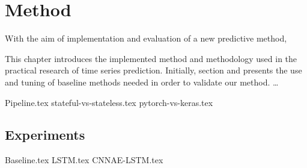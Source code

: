 \chapter{Method}
\label{section:Method}

With the aim of implementation and evaluation of a new predictive method,

This chapter introduces the implemented method and methodology used in the practical research of time series prediction.
Initially, section  and  presents the use and tuning of baseline methods needed in order to validate our method.
\dots

{Pipeline.tex}
{stateful-vs-stateless.tex}
{pytorch-vs-keras.tex}

\section{Experiments}
{Baseline.tex}
{LSTM.tex}
{CNNAE-LSTM.tex}
